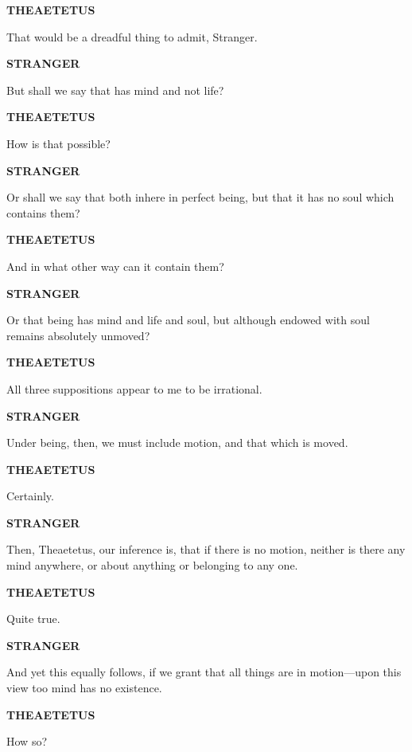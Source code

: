 \documentclass[11pt,letter]{article}
\begin{document}
\par \textbf{THEAETETUS}
\par   That would be a dreadful thing to admit, Stranger.

\par \textbf{STRANGER}
\par   But shall we say that has mind and not life?

\par \textbf{THEAETETUS}
\par   How is that possible?

\par \textbf{STRANGER}
\par   Or shall we say that both inhere in perfect being, but that it has no soul which contains them?

\par \textbf{THEAETETUS}
\par   And in what other way can it contain them?

\par \textbf{STRANGER}
\par   Or that being has mind and life and soul, but although endowed with soul remains absolutely unmoved?

\par \textbf{THEAETETUS}
\par   All three suppositions appear to me to be irrational.

\par \textbf{STRANGER}
\par   Under being, then, we must include motion, and that which is moved.

\par \textbf{THEAETETUS}
\par   Certainly.

\par \textbf{STRANGER}
\par   Then, Theaetetus, our inference is, that if there is no motion, neither is there any mind anywhere, or about anything or belonging to any one.

\par \textbf{THEAETETUS}
\par   Quite true.

\par \textbf{STRANGER}
\par   And yet this equally follows, if we grant that all things are in motion—upon this view too mind has no existence.

\par \textbf{THEAETETUS}
\par   How so?
\end{document}
